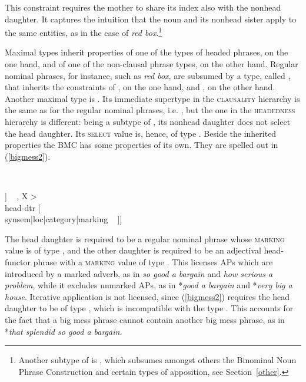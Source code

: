 \documentclass[output=paper
                ,modfonts
                ,nonflat
	        ,collection
	        ,collectionchapter
	        ,collectiontoclongg
 	        ,biblatex
                ,babelshorthands
                ,newtxmath
                ,draftmode
                ,colorlinks, citecolor=brown
]{./langsci/langscibook}
\begin{document}
\noindent 
This constraint requires the mother to share its index also with the 
nonhead daughter. It captures the intuition that the 
noun and its nonhead sister apply to the same entities, as in 
the case of \emph{red box}.\footnote{Another subtype of  
is , which subsumes amongst others 
the Binominal Noun Phrase Construction and certain types of apposition,
see Section~\ref{other}.}  

Maximal types inherit properties of one of the types of headed phrases,
on the one hand, and of one of the non-clausal phrase types, on the other hand.  
Regular nominal phrases, for instance, such as \emph{red box}, are subsumed 
by a type, called , that inherits the 
constraints of , on the one hand, and 
, on the other hand.  
Another maximal type is . 
Its immediate supertype in the \textsc{clausality} hierarchy is the same 
as for the regular nominal phrases, i.e. , 
but the one in the \textsc{headedness} hierarchy is different: 
being a subtype of , 
its nonhead daughter does not select the head daughter. Its \textsc{select} 
value is, hence, of type . 
Beside the inherited properties the BMC has some properties of its own.   
They are spelled out in (\ref{bigmess2}).

\begin{exe}
\ex\label{bigmess2} 
 ~ \impl ~ 
\begin{avm}
 [ dtrs ~ <[\type{head-functor-phrase}                           \\
            synsem|loc|category [head    & \type{adjective}      \\
                                 marking & \type{marked}]] ~ , X > \\
 head-dtr [                         \\
           synsem|loc|category|marking ~ ]]
\end{avm}
\end{exe}

\noindent
The head daughter is required to be a regular nominal phrase 
whose \textsc{marking} value is of type , and the other daughter 
is required to be an adjectival head-functor phrase
with a \textsc{marking} value of type . 
This licenses APs which are introduced by a marked adverb, 
as in \emph{so good a bargain} and \emph{how serious a problem}, 
while it excludes unmarked APs, as in 
*\emph{good a bargain} and *\emph{very big a house}.
Iterative application is not licensed, since (\ref{bigmess2}) requires the 
head daughter to be of type , which is incompatible with the type 
. This accounts for the fact that a big
mess phrase cannot contain another big mess phrase, as in
*\emph{that splendid so good a bargain}.
\end{document}
